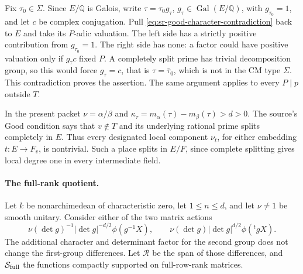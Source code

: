 Fix \(\tau_0\in\Sigma\).  Since \(E/\mathbb Q\) is Galois,
write \(\tau=\tau_0g_\tau\), \(g_\tau\in\operatorname{Gal}(E/\mathbb Q)\),
with \(g_{\tau_0}=1\), and let \(c\) be complex conjugation.
Pull \eqref{eq:sr-good-character-contradiction} back to \(E\)
and take its \(P\)-adic valuation.  The left side has a
strictly positive contribution from \(g_{\tau_0}=1\).
The right side has none: a factor could have positive
valuation only if \(g_\tau c\) fixed \(P\).  A completely split
prime has trivial decomposition group, so this would force
\(g_\tau=c\), that is \(\tau=\bar\tau_0\), which is not in the
CM type \(\Sigma\).  This contradiction proves the assertion.
The same argument applies to every \(P\mid p\) outside \(T\).

In the present packet \(\nu=\alpha/\beta\) and
\(\kappa_\tau=m_\alpha(\tau)-m_\beta(\tau)>d>0\).
The source's \(\mathrm{Good}\) condition says that \(v\notin T\)
and its underlying rational prime splits completely in \(E\).
Thus every designated local component \(\nu_t\), for either
embedding \(t:E\to F_v\), is nontrivial.  Such a place splits
in \(E/F\), since complete splitting gives local degree one
in every intermediate field.

\paragraph{The full-rank quotient.}
Let \(k\) be nonarchimedean of characteristic zero, let
\(1\le n\le d\), and let \(\nu\ne1\) be smooth unitary.
Consider either of the two matrix actions
\[
 \nu(\det g)^{-1}|\det g|^{-d/2}\phi(g^{-1}X),
 \qquad
 \nu(\det g)|\det g|^{d/2}\phi({}^tgX).
\]
The additional character and determinant factor for the
second group does not change the first-group differences.
Let \(\mathcal R\) be the span of those differences, and
\(\mathcal S_{\rm full}\) the functions compactly supported
on full-row-rank matrices.

